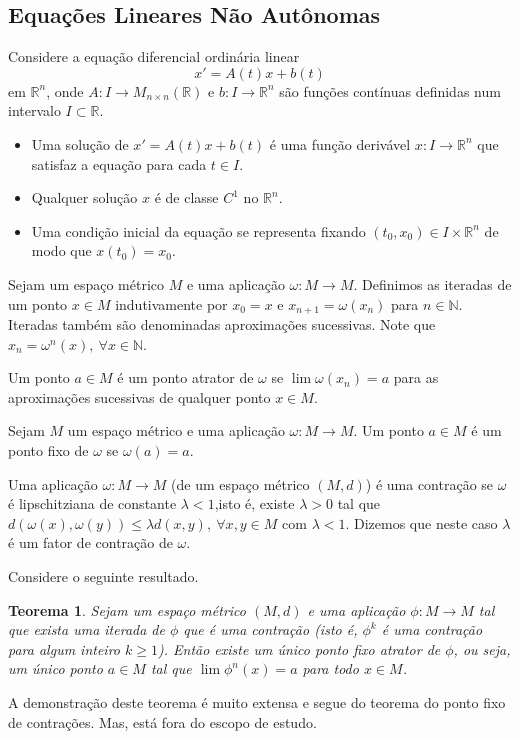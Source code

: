 \documentclass[a4paper, 12pt]{article}
\renewcommand{\Bbb}{\mathbb}
\newtheorem*{1}{Teorema}
\begin{document}
\subsection{Equações Lineares Não Autônomas}
Considere a equação diferencial ordinária linear $$x' = A(t)x + b(t)$$ em $\Bbb R^n$, onde $A:I\to M_{n\times n}(\Bbb R)$ e $b:I\to \Bbb R^n$ são funções contínuas definidas num intervalo $I \subset \Bbb R$. 

\begin{itemize}
\item Uma solução de $x' = A(t)x + b(t)$ é uma função derivável $x:I\to \Bbb R^n$ que satisfaz a equação para cada $t \in I$.
\item Qualquer solução $x$ é de classe $C^1$ no $\Bbb R^n$.
\item Uma condição inicial da equação se representa fixando $(t_0,x_0) \in I\times \Bbb R^n$ de modo que $x(t_0) = x_0$.
\end{itemize}

Sejam um espaço métrico $M$ e uma aplicação $\omega:M\to M$. Definimos as iteradas de um ponto $x\in M$ indutivamente por $x_0=x$ e $x_{n+1}=\omega(x_n)$ para $n\in \Bbb N$. Iteradas também são denominadas aproximações sucessivas. Note que $x_n = \omega^n(x),\ \forall x \in \Bbb N$.

Um ponto $a \in M$ é um ponto atrator de $\omega$ se $\lim\omega(x_n) = a$ para as aproximações sucessivas de qualquer ponto $x\in M$.

Sejam $M$ um espaço métrico e uma aplicação  $\omega:M\to M$. Um ponto $a\in M$ é um ponto fixo de $\omega$ se $\omega(a) = a$.

Uma aplicação $\omega:M\to M$ (de um espaço métrico $(M,d)$) é uma contração se $\omega$ é lipschitziana de constante $\lambda < 1$,isto é, existe $\lambda > 0$ tal que $d(\omega(x),\omega(y)) \leq \lambda d(x,y),\ \forall x,y\in M$ com $\lambda < 1$. Dizemos que neste caso $\lambda$ é um fator de contração de $\omega$.

Considere o seguinte resultado.
\begin{1}
Sejam um espaço métrico $(M,d)$ e uma aplicação $\phi:M\to M$ tal que exista uma iterada de $\phi$ que é uma contração (isto é, $\phi^k$ é uma contração para algum inteiro $k \geq 1$). Então existe um único ponto fixo atrator de $\phi$, ou seja, um único ponto $a\in M$ tal que $\lim\phi^n(x) = a$ para todo $x\in M$.
\end{1}
A demonstração deste teorema é muito extensa e segue do teorema do ponto fixo de contrações. Mas, está fora do escopo de estudo.
\end{document}
